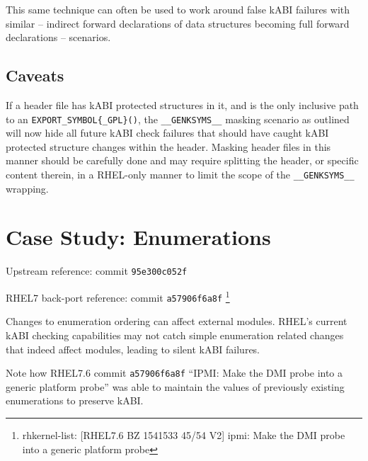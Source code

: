 \documentclass[10pt,oneside,english]{book}
\begin{document}
This same technique can often be used to work around false kABI failures
with similar -- indirect forward declarations of data structures
becoming full forward declarations -- scenarios.

\subsection{Caveats}

If a header file has kABI protected structures in it, and is the only
inclusive path to an \texttt{EXPORT\_SYMBOL\{\_GPL\}()}, the \texttt{\_\_GENKSYMS\_\_}
masking scenario as outlined will now hide all future kABI check failures
that should have caught kABI protected structure changes within the
header. Masking header files in this manner should be carefully done
and may require splitting the header, or specific content therein,
in a RHEL-only manner to limit the scope of the \texttt{\_\_GENKSYMS\_\_}
wrapping.

\section{Case Study: Enumerations \label{sec:Case-Study:Enumerations}}

Upstream reference: commit \texttt{95e300c052f}

RHEL7 back-port reference: commit \texttt{a57906f6a8f} \footnote{rhkernel-list: {[}RHEL7.6 BZ 1541533 45/54 V2{]} ipmi: Make the DMI
probe into a generic platform probe}

Changes to enumeration ordering can affect external modules. RHEL's
current kABI checking capabilities may not catch simple enumeration
related changes that indeed affect modules, leading to silent kABI
failures.

Note how RHEL7.6 commit \texttt{a57906f6a8f} ``IPMI: Make the DMI
probe into a generic platform probe'' was able to maintain the values
of previously existing enumerations to preserve kABI.

\end{document}
